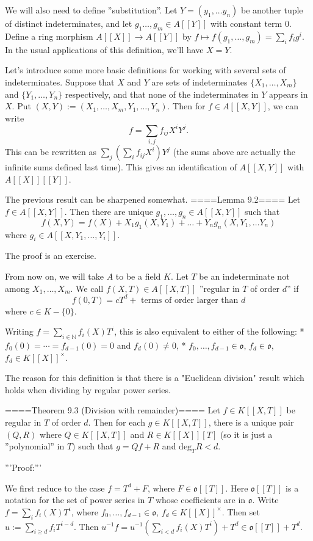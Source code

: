 We will also need to define ''substitution''. Let $Y=(y_1,\ldots y_n)$ be another tuple of distinct indeterminates, and let $g_1\ldots, g_m\in A[[Y]]$ with constant term $0$. Define a ring morphism $A[[X]]\rightarrow A[[Y]]$ by $f\mapsto f(g_1,\ldots, g_m)=\sum_i f_i g^i$. In the usual applications of this definition, we'll have $X=Y$.

Let's introduce some more basic definitions for working with several sets of indeterminates. Suppose that $X$ and $Y$ are sets of indeterminates $\{X_1,\ldots,X_m\}$ and $\{Y_1,\ldots,Y_n\}$ respectively, and that none of the indeterminates in $Y$ appears in $X$. Put $(X,Y):=(X_1,\ldots, X_m, Y_1,\ldots, Y_n)$. Then for $f\in A[[X,Y]]$, we can write 
$$f= \sum_{i,j} f_{ij} X^iY^j.$$
This can be rewritten as $\sum_j(\sum_i f_{ij}X^i)Y^j$ (the sums above are actually the infinite sums defined last time). This gives an identification of $A[[X,Y]]$ with $A[[X]][[Y]]$.

The previous result can be sharpened somewhat.
====Lemma 9.2==== Let $f\in A[[X,Y]]$. Then there are unique $g_1,\ldots, g_n\in A[[X,Y]]$ such that
$$f(X,Y)=f(X)+X_1 g_1(X, Y_1)+\ldots + Y_n g_n(X, Y_1,\ldots Y_n)$$
where $g_i\in A[[X,Y_1,\ldots, Y_i]]$. 

The proof is an exercise.

From now on, we will take $A$ to be a field $K$. Let $T$ be an indeterminate not among $X_1,\ldots, X_m$. We call $f(X,T)\in A[[X,T]]$ ''regular in $T$ of order $d$'' if 
$$f(0,T)=cT^d+\textrm{ terms of order larger than }d$$
where $c\in K-\{0\}$.

Writing $f=\sum_{i\in\mathbb{N}} f_i(X)T^i$, this is also equivalent to either of the following:
* $f_0(0)=\cdots =f_{d-1}(0)=0$ and $f_d(0)\neq 0$,
* $f_0,\ldots, f_{d-1}\in \mathfrak{o}$, $f_d\in \mathfrak{o}$, $f_d\in K[[X]]^\times$.

The reason for this definition is that there is a "Euclidean division" result which holds when dividing by regular power series.

====Theorem 9.3 (Division with remainder)====
Let $f\in K[[X,T]]$ be regular in $T$ of order $d$. Then for each $g\in K[[X,T]]$, there is a unique pair $(Q,R)$ where $Q\in K[[X,T]]$ and $R\in K[[X]][T]$ (so it is just a ''polynomial'' in $T$) such that $g=Qf+R$ and $\mathrm{deg}_TR<d$.

'''Proof:'''

We first reduce to the case $f=T^d+F$, where $F\in\mathfrak{o}[[T]]$. Here $\mathfrak{o}[[T]]$ is a notation for the set of power series in $T$ whose coefficients are in $\mathfrak{o}$. Write $f=\sum_i f_i(X) T^i$, where $f_0,\ldots, f_{d-1}\in\mathfrak{o}$, $f_d\in K[[X]]^\times$. Then set $u:=\sum_{i\ge d} f_i T^{i-d}$. Then $u^{-1}f= u^{-1}(\sum_{i<d} f_i(X)T^i)+T^d\in \mathfrak{o}[[T]]+T^d$.

